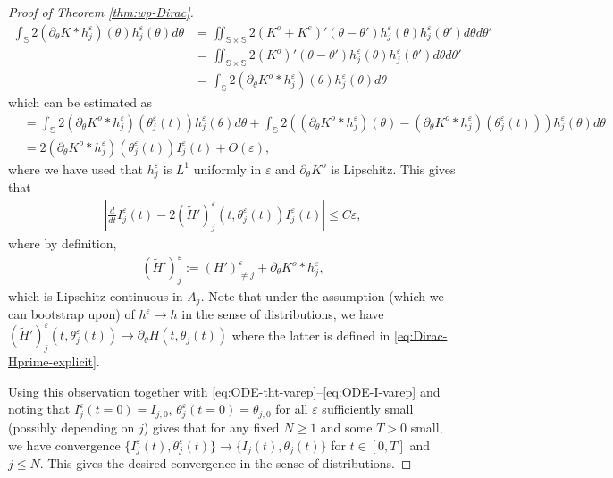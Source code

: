 \documentclass[10pt]{article}
\theoremstyle{definition}
\theoremstyle{remark}
\numberwithin{equation}{section}
\newcommand{\rd}{\partial}
\newcommand{\0}{\emptyset}
\newcommand{\tht}{\theta}
\newcommand{\varep}{\varepsilon}
\newcommand{\bbS}{\mathbb S}
\begin{document}
\begin{proof}[Proof of Theorem \ref{thm:wp-Dirac}]
\begin{equation*}
			\begin{split}
				\int_{\bbS} 2 (\rd_\tht K*h^\varep_j) (\tht) h^\varep_j(\tht) d\tht  & = \iint_{\bbS\times\bbS} 2 (K^o + K^e)'(\tht-\tht') h^\varep_j (\tht) h^\varep_j (\tht') d\tht d\tht' \\
				& = \iint_{\bbS\times\bbS} 2 (K^o)'(\tht-\tht') h^\varep_j (\tht) h^\varep_j (\tht') d\tht d\tht' \\
				& = \int_{\bbS} 2 (\rd_\tht K^o *h^\varep_j) (\tht) h^\varep_j(\tht) d\tht  
			\end{split}
		\end{equation*} which can be estimated as \begin{equation*}
			\begin{split}
				& = \int_{\bbS} 2 (\rd_\tht K^o *h^\varep_j) (\tht^\varep_j(t)) h^\varep_j(\tht) d\tht + \int_{\bbS} 2( (\rd_\tht K^o *h^\varep_j) (\tht) - (\rd_\tht K^o *h^\varep_j) (\tht^\varep_j(t))) h^\varep_j(\tht) d\tht \\
				& = 2(\rd_\tht K^o *h^\varep_j) (\tht^\varep_j(t)) I^\varep_j(t) + O(\varep),
			\end{split}
		\end{equation*} where we have used that $h^\varep_j$ is $L^1$ uniformly in $\varep $ and $\rd_\tht K^o$ is Lipschitz. This gives that \begin{equation}\label{eq:ODE-I-varep}
			\begin{split}
				\left| \frac{d}{dt} I^\varep_{j} (t)  - 2 (\tilde{H}')^\varep_{j}(t, \tht^\varep_{j}(t)) I^\varep_{j} (t) \right| \le C\varep,
			\end{split}
		\end{equation} where by definition, \begin{equation*}
			\begin{split}
				(\tilde{H}')^\varep_{j} := (H')^\varep_{\ne j} + \rd_\tht K^o *h^\varep_j,
			\end{split}
		\end{equation*} which is Lipschitz continuous in $A_{j}$. Note that under the assumption (which we can bootstrap upon) of $h^\varep \to h$ in the sense of distributions, we have $( \tilde{H}')^\varep_{j}(t,\tht^\varep_{j}(t)) \to \partial_{\theta} H(t,\tht_{j}(t))$ where the latter is defined in \eqref{eq:Dirac-Hprime-explicit}. 
		
		Using this observation together with \eqref{eq:ODE-tht-varep}--\eqref{eq:ODE-I-varep} and noting that $I^{\varep}_{j}(t=0) = I_{j,0}$, $\tht^{\varep}_{j}(t=0) = \tht_{j,0}$ for all $\varep$ sufficiently small (possibly depending on $j$) gives that for any fixed $N\ge1$ and some $T>0$ small, we have convergence $\{ I^{\varep}_{j}(t), \tht^{\varep}_{j}(t) \} \to \{ I_{j}(t), \tht_{j}(t) \}$ for $t \in [0,T]$ and $j\le N$. This gives the desired convergence in the sense of distributions. 
	\end{proof}
	
\end{document}
